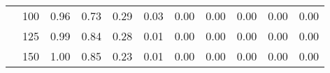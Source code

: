 \begin{table}[t]
\begin{center}
\begin{subtable}[c]{\textwidth}
\begin{center}
\begin{tabular}{rcccccccccc}
                                        & \multicolumn{1}{c|}{100}  & \num{0.96}  & \num{0.73}  & \num{0.29}  & \num{0.03}  & \num{0.00}  & \num{0.00}  & \num{0.00}  & \num{0.00}  & \num{0.00}  \\
                                        & \multicolumn{1}{c|}{125}  & \num{0.99}  & \num{0.84}  & \num{0.28}  & \num{0.01}  & \num{0.00}  & \num{0.00}  & \num{0.00}  & \num{0.00}  & \num{0.00}  \\
                                        & \multicolumn{1}{c|}{150}  & \num{1.00}  & \num{0.85}  & \num{0.23}  & \num{0.01}  & \num{0.00}  & \num{0.00}  & \num{0.00}  & \num{0.00}  & \num{0.00}  \\
                                    \end{tabular}
            \end{center}
        \end{subtable}

        \vspace{5mm}


\end{center}
\end{table}
